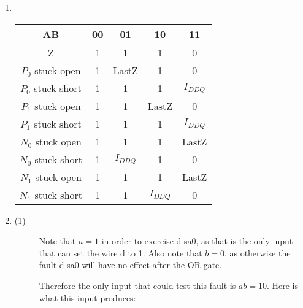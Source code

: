 \documentclass[a4paper,12pt]{article}
\begin{document}
\begin{enumerate}
        \item \mbox{}\\

            \begin{tabular}{|c|c|c|c|c|}
                \hline
                AB                & 00 & 01        & 10        & 11        \\ \hline
                Z                 & 1  & 1         & 1         & 0         \\ \hline
                $P_0$ stuck open  & 1  & LastZ     & 1         & 0         \\ \hline
                $P_0$ stuck short & 1  & 1         & 1         & $I_{DDQ}$ \\ \hline
                $P_1$ stuck open  & 1  & 1         & LastZ     & 0         \\ \hline
                $P_1$ stuck short & 1  & 1         & 1         & $I_{DDQ}$ \\ \hline
                $N_0$ stuck open  & 1  & 1         & 1         & LastZ     \\ \hline
                $N_0$ stuck short & 1  & $I_{DDQ}$ & 1         & 0         \\ \hline
                $N_1$ stuck open  & 1  & 1         & 1         & LastZ     \\ \hline
                $N_1$ stuck short & 1  & 1         & $I_{DDQ}$ & 0         \\ \hline
            \end{tabular}

        \item
            \begin{description}
                \item[(1)] Note that $a = 1$ in order to exercise d sa0, as that is the only input that can set the wire d to 1.
                    Also note that $b = 0$, as otherwise the fault d sa0 will have no effect after the OR-gate.

                    Therefore the only input that could test this fault is $ab = 10$. Here is what this input produces:


\end{description}
\end{enumerate}
\end{document}
